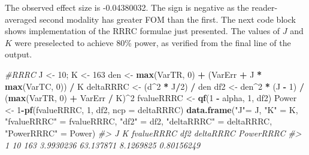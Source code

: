 \documentclass[
]{book}
\newenvironment{Shaded}{\begin{snugshade}}{\end{snugshade}}
\newcommand{\CommentTok}[1]{\textcolor[rgb]{0.56,0.35,0.01}{\textit{#1}}}
\newcommand{\DataTypeTok}[1]{\textcolor[rgb]{0.13,0.29,0.53}{#1}}
\newcommand{\DecValTok}[1]{\textcolor[rgb]{0.00,0.00,0.81}{#1}}
\newcommand{\KeywordTok}[1]{\textcolor[rgb]{0.13,0.29,0.53}{\textbf{#1}}}
\newcommand{\NormalTok}[1]{#1}
\newcommand{\OperatorTok}[1]{\textcolor[rgb]{0.81,0.36,0.00}{\textbf{#1}}}
\newcommand{\StringTok}[1]{\textcolor[rgb]{0.31,0.60,0.02}{#1}}
\begin{document}
The observed effect size is -0.04380032. The sign is negative as the reader-averaged second modality has greater FOM than the first. The next code block shows implementation of the RRRC formulae just presented. The values of \(J\) and \(K\) were preselected to achieve 80\% power, as verified from the final line of the output.

\begin{Shaded}
\begin{Highlighting}[]
\CommentTok{\#RRRC}
\NormalTok{J \textless{}{-}}\StringTok{ }\DecValTok{10}\NormalTok{; K \textless{}{-}}\StringTok{ }\DecValTok{163}
\NormalTok{den \textless{}{-}}\StringTok{ }\KeywordTok{max}\NormalTok{(VarTR, }\DecValTok{0}\NormalTok{) }\OperatorTok{+}\StringTok{ }\NormalTok{(VarErr }\OperatorTok{+}\StringTok{ }\NormalTok{J }\OperatorTok{*}\StringTok{ }\KeywordTok{max}\NormalTok{(VarTC, }\DecValTok{0}\NormalTok{)) }\OperatorTok{/}\StringTok{ }\NormalTok{K }
\NormalTok{deltaRRRC \textless{}{-}}\StringTok{ }\NormalTok{(d}\OperatorTok{\^{}}\DecValTok{2} \OperatorTok{*}\StringTok{ }\NormalTok{J}\OperatorTok{/}\DecValTok{2}\NormalTok{) }\OperatorTok{/}\StringTok{ }\NormalTok{den}
\NormalTok{df2 \textless{}{-}}\StringTok{ }\NormalTok{den}\OperatorTok{\^{}}\DecValTok{2} \OperatorTok{*}\StringTok{ }\NormalTok{(J }\OperatorTok{{-}}\StringTok{ }\DecValTok{1}\NormalTok{) }\OperatorTok{/}\StringTok{ }\NormalTok{(}\KeywordTok{max}\NormalTok{(VarTR, }\DecValTok{0}\NormalTok{) }\OperatorTok{+}\StringTok{ }\NormalTok{VarErr }\OperatorTok{/}\StringTok{ }\NormalTok{K)}\OperatorTok{\^{}}\DecValTok{2}
\NormalTok{fvalueRRRC \textless{}{-}}\StringTok{ }\KeywordTok{qf}\NormalTok{(}\DecValTok{1} \OperatorTok{{-}}\StringTok{ }\NormalTok{alpha, }\DecValTok{1}\NormalTok{, df2)}
\NormalTok{Power \textless{}{-}}\StringTok{ }\DecValTok{1}\OperatorTok{{-}}\KeywordTok{pf}\NormalTok{(fvalueRRRC, }\DecValTok{1}\NormalTok{, df2, }\DataTypeTok{ncp =}\NormalTok{ deltaRRRC)}
\KeywordTok{data.frame}\NormalTok{(}\StringTok{"J"}\NormalTok{=}\StringTok{ }\NormalTok{J,  }\StringTok{"K"}\NormalTok{ =}\StringTok{ }\NormalTok{K, }\StringTok{"fvalueRRRC"}\NormalTok{ =}\StringTok{ }\NormalTok{fvalueRRRC, }\StringTok{"df2"}\NormalTok{ =}\StringTok{ }\NormalTok{df2, }\StringTok{"deltaRRRC"}\NormalTok{ =}\StringTok{ }\NormalTok{deltaRRRC, }\StringTok{"PowerRRRC"}\NormalTok{ =}\StringTok{ }\NormalTok{Power)}
\CommentTok{\#\textgreater{}    J   K fvalueRRRC       df2 deltaRRRC  PowerRRRC}
\CommentTok{\#\textgreater{} 1 10 163  3.9930236 63.137871 8.1269825 0.80156249}
\end{Highlighting}
\end{Shaded}
\end{document}

